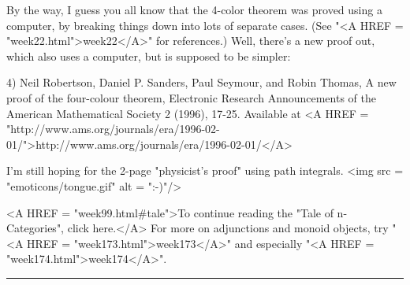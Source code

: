 By the way, I guess you all know that the 4-color theorem was proved 
using a computer, by breaking things down into lots of separate cases.  
(See "<A HREF = "week22.html">week22</A>" for references.)  Well, there's a new proof out, which also 
uses a computer, but is supposed to be simpler:

4) Neil Robertson, Daniel P. Sanders, Paul Seymour, and Robin Thomas,
A new proof of the four-colour theorem, Electronic Research Announcements
of the American Mathematical Society 2 (1996), 17-25.  Available at
<A HREF = "http://www.ams.org/journals/era/1996-02-01/">http://www.ams.org/journals/era/1996-02-01/</A>

I'm still hoping for the 2-page "physicist's proof" using 
path integrals.  <img src = "emoticons/tongue.gif" alt = ":-)"/>

<A HREF = "week99.html#tale">To continue reading the "Tale of
n-Categories", click here.</A>
For more on adjunctions and monoid objects, try "<A HREF =
"week173.html">week173</A>" and especially
"<A HREF = "week174.html">week174</A>".
\par\noindent\rule{\textwidth}{0.4pt}

